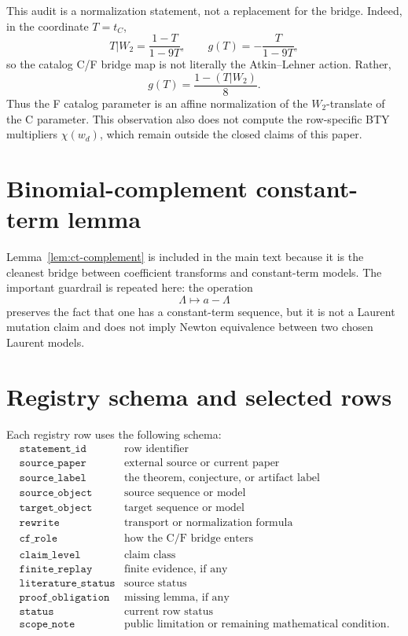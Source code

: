 \documentclass[11pt,a4paper]{article}
\begin{document}
This audit is a normalization statement, not a replacement for the bridge.
Indeed, in the coordinate \(T=t_C\),
\[
  T|W_2=\frac{1-T}{1-9T},
  \qquad
  g(T)=-\frac{T}{1-9T},
\]
so the catalog C/F bridge map is not literally the Atkin--Lehner action.
Rather,
\[
  g(T)=\frac{1-(T|W_2)}{8}.
\]
Thus the F catalog parameter is an affine normalization of the \(W_2\)-translate
of the C parameter.  This observation also does not compute the row-specific
BTY multipliers \(\chi(w_d)\), which remain outside the closed claims of this
paper.

\section{Binomial-complement constant-term lemma}
\label{app:ct-complement}

Lemma~\ref{lem:ct-complement} is included in the main text because it is the
cleanest bridge between coefficient transforms and constant-term models.  The
important guardrail is repeated here: the operation
\[
  \Lambda\mapsto a-\Lambda
\]
preserves the fact that one has a constant-term sequence, but it is not a
Laurent mutation claim and does not imply Newton equivalence between two
chosen Laurent models.

\section{Registry schema and selected rows}
\label{app:registry}

Each registry row uses the following schema:
\[
\begin{array}{ll}
\texttt{statement\_id} & \text{row identifier}\\
\texttt{source\_paper} & \text{external source or current paper}\\
\texttt{source\_label} & \text{the theorem, conjecture, or artifact label}\\
\texttt{source\_object} & \text{source sequence or model}\\
\texttt{target\_object} & \text{target sequence or model}\\
\texttt{rewrite} & \text{transport or normalization formula}\\
\texttt{cf\_role} & \text{how the C/F bridge enters}\\
\texttt{claim\_level} & \text{claim class}\\
\texttt{finite\_replay} & \text{finite evidence, if any}\\
\texttt{literature\_status} & \text{source status}\\
\texttt{proof\_obligation} & \text{missing lemma, if any}\\
\texttt{status} & \text{current row status}\\
\texttt{scope\_note} & \text{public limitation or remaining mathematical condition}.
\end{array}
\]
\end{document}
